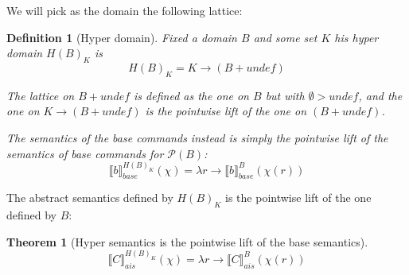 \documentclass{article}
\newtheorem{definition}{Definition}
\newtheorem{theorem}{Theorem}
\def\rr{\rightarrow}
\newcommand*{\sem}[1]{
    \llbracket #1 \rrbracket
}
\newcommand{\bca}[2]{
    #2_{ais}^{#1}
}
\newcommand{\bsem}[2][A]{
    \bca{#1}{\sem{#2}}
}
\newcommand{\basesem}[2][A]{
    \sem{#2}_{base}
}
\newcommand{\pow}[1]{
    \mathcal{P}(#1)
}
\def\rr{\rightarrow}
\begin{document}
    We will pick as the domain the following lattice:
    \begin{definition}[Hyper domain]
        Fixed a domain $B$ and some set $K$ his hyper domain $H(B)_K$ is
        $$H(B)_K = K \rr (B + undef)$$

        The lattice on $B + undef$ is defined as the one
        on $B$ but with $\emptyset > undef$, and the one on 
        $K \rr (B + undef)$ is the pointwise lift
        of the one on $(B + undef)$.

        The semantics of the base commands instead is simply the pointwise lift
        of the semantics of base commands for $\pow{B}$:
        $$\basesem{b}^{H(B)_K}(\chi) = 
            \lambda r \rr \basesem{b}^{B}(\chi(r))$$
    \end{definition}

    The abstract semantics defined by $H(B)_K$ is the pointwise lift of the one
    defined by $B$:
    \begin{theorem}[Hyper semantics is the pointwise lift of the base semantics]
        \label{thm:hyper-add}
        $$\bsem[H(B)_K]{C}(\mathcal{\chi}) = \lambda r \rr \bsem[B]{C}(\chi(r))$$
    \end{theorem}
\end{document}
